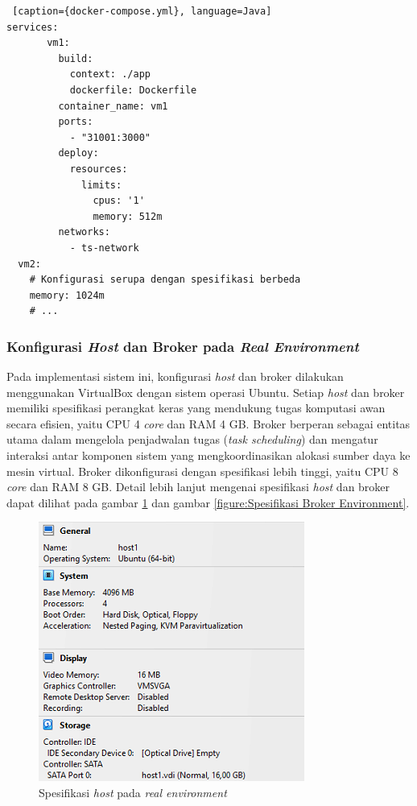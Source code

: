 \begin{lstlisting} [caption={docker-compose.yml}, language=Java]
services:
       vm1:
         build:
           context: ./app
           dockerfile: Dockerfile
         container_name: vm1
         ports:
           - "31001:3000"
         deploy:
           resources:
             limits:
               cpus: '1'
               memory: 512m
         networks:
           - ts-network
  vm2:
    # Konfigurasi serupa dengan spesifikasi berbeda
    memory: 1024m
    # ...
\end{lstlisting}

\subsubsection{Konfigurasi \textit{Host} dan Broker pada \textit{Real Environment}}
Pada implementasi sistem ini, konfigurasi \textit{host} dan broker dilakukan menggunakan VirtualBox dengan sistem operasi Ubuntu. Setiap \textit{host} dan broker memiliki spesifikasi perangkat keras yang mendukung tugas komputasi awan secara efisien, yaitu CPU 4 \textit{core} dan RAM 4 GB. Broker berperan sebagai entitas utama dalam mengelola penjadwalan tugas (\textit{task scheduling}) dan mengatur interaksi antar komponen sistem yang mengkoordinasikan alokasi sumber daya ke mesin virtual. Broker dikonfigurasi dengan spesifikasi lebih tinggi, yaitu CPU 8 \textit{core} dan RAM 8 GB. Detail lebih lanjut mengenai spesifikasi \textit{host} dan broker dapat dilihat pada gambar \ref{figure:Spesifikasi Host pada Real Environment} dan gambar \ref{figure:Spesifikasi Broker Environment}.

\newpage

\begin{figure} [H]
    \centering
    \includegraphics[width=0.5\linewidth]{gambar/Spesifikasi Host pada Real Environment.png}
    \caption{Spesifikasi \textit{host} pada \textit{real environment}}
    \label{figure:Spesifikasi Host pada Real Environment}
\end{figure}


